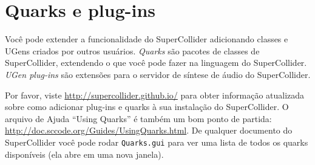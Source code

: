 \section{Quarks e plug-ins}

Você pode extender a funcionalidade do SuperCollider adicionando classes e UGens criados por outros usuários. \emph{Quarks} são pacotes de classes de SuperCollider, extendendo o que você pode fazer na linguagem do SuperCollider. \emph{UGen plug-ins} são extensões para o servidor de síntese de áudio do SuperCollider.

Por favor, viste \url{http://supercollider.github.io/} para obter informação atualizada sobre como adicionar plug-ins e quarks à sua instalação do SuperCollider. O arquivo de Ajuda “Using Quarks” é também um bom ponto de partida: \url{http://doc.sccode.org/Guides/UsingQuarks.html}. De qualquer documento do SuperCollider você pode rodar \texttt{Quarks.gui} para ver uma lista de todos os quarks disponíveis (ela abre em uma nova janela).
